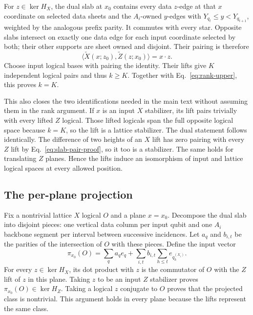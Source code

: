 For $z\in\ker H_X$, the dual slab at $x_0$ contains every data $z$-edge
at that $x$ coordinate on selected data sheets and the $A_i$-owned
$y$-edges with $Y_{q_t}\le y<Y_{q_{t+1}}$, weighted by the analogous
prefix parity. It commutes with every star. Opposite slabs intersect on
exactly one data edge for each input coordinate selected by both; their
other supports are sheet owned and disjoint. Their pairing is therefore
\begin{equation}
 \langle\widetilde X(x;z_0),\widetilde Z(z;x_0)\rangle=x\cdot z.
 \label{eq:slab-pair-proof}
\end{equation}
Choose input logical bases with pairing the identity. Their lifts give
$K$ independent logical pairs and thus $k\ge K$. Together with
Eq.~\eqref{eq:rank-upper}, this proves $k=K$.

This also closes the two identifications needed in the main text without
assuming them in the rank argument. If $x$ is an input $X$ stabilizer,
its lift pairs trivially with every lifted $Z$ logical. Those lifted
logicals span the full opposite logical space because $k=K$, so the lift
is a lattice stabilizer. The dual statement follows identically.
The difference of two heights of an $X$ lift has zero pairing with every
$Z$ lift by Eq.~\eqref{eq:slab-pair-proof}, so it too is a stabilizer.
The same holds for translating $Z$ planes. Hence the lifts induce an
isomorphism of input and lattice logical spaces at every allowed position.

\subsection{The per-plane projection}
Fix a nontrivial lattice $X$ logical $O$ and a plane $x=x_0$. Decompose
the dual slab into disjoint pieces: one vertical data column per input
qubit and one $A_i$ backbone segment per interval between successive
incidences. Let $a_q$ and $b_{i,t}$ be the parities of the intersection of
$O$ with these pieces. Define the input vector
\begin{equation}
 \pi_{x_0}(O)=\sum_q a_q e_q+
       \sum_{i,t}b_{i,t}\sum_{h\le t}e_{q_h^{(X_i)}}.
 \label{eq:plane-projection}
\end{equation}
For every $z\in\ker H_X$, its dot product with $z$ is the commutator
of $O$ with the $Z$ lift of $z$ in this plane. Taking $z$ to be an input
$Z$ stabilizer proves $\pi_{x_0}(O)\in\ker H_Z$. Taking a logical $z$
conjugate to $O$ proves that the projected class is nontrivial. This
argument holds in every plane because the lifts represent the same class.


